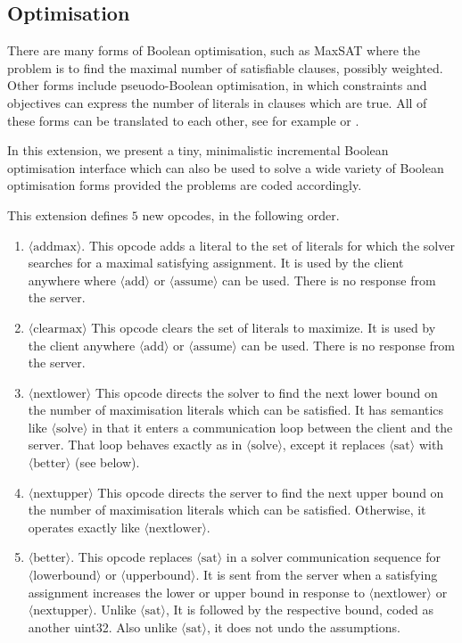 \documentclass{article}
\newcommand\proto[1]{$\langle\mbox{#1}\rangle$}
\begin{document}
\subsection{Optimisation}

There are many forms of Boolean optimisation, such as MaxSAT where the problem
is to find the maximal number of satisfiable clauses, possibly weighted.  Other
forms include pseuodo-Boolean optimisation, in which constraints and objectives
can express the number of literals in clauses which are true.  All of these
forms can be translated to each other, see for example
\cite{DBLP:journals/jar/LiffitonS08} or \cite{DBLP:journals/jsat/EenS06}.

In this extension, we present a tiny, minimalistic incremental Boolean
optimisation interface which can also be used to solve a wide variety of
Boolean optimisation forms provided the problems are coded accordingly.

This extension defines $5$ new opcodes, in the following order.

\begin{enumerate}
	\item \proto{addmax}.  This opcode adds a literal to the set of literals for which
		the solver searches for a maximal satisfying assignment.  It is used by 
		the client anywhere where \proto{add} or \proto{assume} can be used.
		There is no response from the server.
	\item \proto{clearmax} This opcode clears the set of literals to maximize.
		It is used by the client anywhere \proto{add} or \proto{assume} can be used.
		There is no response from the server.
	\item \proto{nextlower} This opcode directs the solver to find the next 
		lower bound on the number of maximisation literals which can be satisfied.
		It has semantics like \proto{solve} in that it enters a communication
		loop between the client and the server.  That loop behaves exactly as
		in \proto{solve}, except it replaces \proto{sat} with \proto{better} (see below).
	\item \proto{nextupper} This opcode directs the server to find the next
		upper bound on the number of maximisation literals which can be satisfied.
		Otherwise, it operates exactly like \proto{nextlower}.
	\item \proto{better}.  This opcode replaces \proto{sat} in a solver communication
		sequence for \proto{lowerbound} or \proto{upperbound}. It is sent from 
		the server when a satisfying assignment increases the lower or upper bound
		in response to \proto{nextlower} or \proto{nextupper}. Unlike \proto{sat}, 
		It is followed by the respective bound, coded as another uint32.  Also
		unlike \proto{sat}, it does not undo the assumptions.
\end{enumerate}
\end{document}
